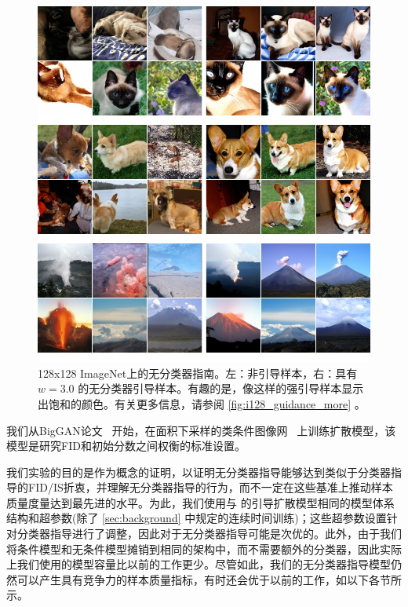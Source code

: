 \documentclass{article}
\begin{document}
 \begin{figure}[tb] \centering
\includegraphics[width=\linewidth]{images/i128_guidance_2.jpg}
\vspace{-2em}
\caption{
128x128 ImageNet上的无分类器指南。左：非引导样本，右：具有 $w=3.0$ 的无分类器引导样本。有趣的是，像这样的强引导样本显示出饱和的颜色。有关更多信息，请参阅 \cref{fig:i128_guidance_more} 。}
\label{fig:i128_guidance}
\end{figure} 


我们从BigGAN论文~ \citep{brock2018large} 开始，在面积下采样的类条件图像网~ \citep{russakovsky2015imagenet} 上训练扩散模型，该模型是研究FID和初始分数之间权衡的标准设置。


我们实验的目的是作为概念的证明，以证明无分类器指导能够达到类似于分类器指导的FID/IS折衷，并理解无分类器指导的行为，而不一定在这些基准上推动样本质量度量达到最先进的水平。为此，我们使用与 \citet{dhariwal2021diffusion} 的引导扩散模型相同的模型体系结构和超参数(除了 \cref{sec:background} 中规定的连续时间训练)；这些超参数设置针对分类器指导进行了调整，因此对于无分类器指导可能是次优的。此外，由于我们将条件模型和无条件模型摊销到相同的架构中，而不需要额外的分类器，因此实际上我们使用的模型容量比以前的工作更少。尽管如此，我们的无分类器指导模型仍然可以产生具有竞争力的样本质量指标，有时还会优于以前的工作，如以下各节所示。
\end{document}
